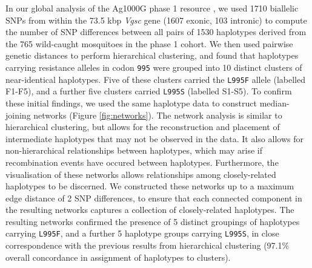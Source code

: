 \documentclass[a4paper,11pt,abstracton,hidelinks]{scrartcl}
\begin{document}
%
In our global analysis of the Ag1000G phase 1 resource \cite{Ag1000gConsortium2017}, we used 1710 biallelic SNPs from within the 73.5 kbp \textit{Vgsc} gene (1607 exonic, 103 intronic) to compute the number of SNP differences between all pairs of 1530 haplotypes derived from the 765 wild-caught mosquitoes in the phase 1 cohort.
%
We then used pairwise genetic distances to perform hierarchical clustering, and found that haplotypes carrying resistance alleles in codon \texttt{995} were grouped into 10 distinct clusters of near-identical haplotypes.
%
Five of these clusters carried the \texttt{L995F} allele (labelled F1-F5), and a further five clusters carried \texttt{L995S} (labelled S1-S5).
%
To confirm these initial findings, we used the same haplotype data to construct median-joining networks (Figure \ref{fig:networks}).
%
The network analysis is similar to hierarchical clustering, but allows for the reconstruction and placement of intermediate haplotypes that may not be observed in the data. 
%
It also allows for non-hierarchical relationships between haplotypes, which may arise if recombination events have occured between haplotypes.
%
Furthermore, the visualisation of these networks allows relationships among closely-related haplotypes to be discerned.
%
We constructed these networks up to a maximum edge distance of 2 SNP differences, to ensure that each connected component in the resulting networks captures a collection of closely-related haplotypes.
%
The resulting networks confirmed the presence of 5 distinct groupings of haplotypes carrying \texttt{L995F}, and a further 5 haplotype groups carrying \texttt{L995S}, in close correspondence with the previous results from hierarchical clustering (97.1\% overall concordance in assignment of haplotypes to clusters).
%
\end{document}
